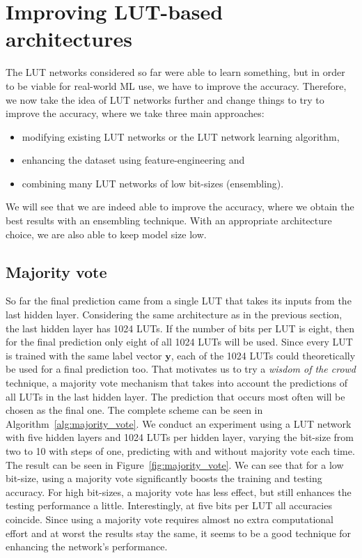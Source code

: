 \section{Improving LUT-based architectures}
The LUT networks considered so far were able to learn something, but in order to be viable for real-world ML use, we have to improve the accuracy. Therefore, we now take the idea of LUT networks further and change things to try to improve the accuracy, where we take three main approaches:

\begin{itemize}
  \item modifying existing LUT networks or the LUT network learning algorithm,
  \item enhancing the dataset using feature-engineering and
  \item combining many LUT networks of low bit-sizes (ensembling).
\end{itemize}We will see that we are indeed able to improve the accuracy, where we obtain the best results with an ensembling technique. With an appropriate architecture choice, we are also able to keep model size low.

\subsection{Majority vote} \label{sec:majority_vote}
So far the final prediction came from a single LUT that takes its inputs from the last hidden layer. Considering the same architecture as in the previous section, the last hidden layer has 1024 LUTs. If the number of bits per LUT is eight, then for the final prediction only eight of all 1024 LUTs will be used. Since every LUT is trained with the same label vector $\bm{y}$, each of the 1024 LUTs could theoretically be used for a final prediction too. That motivates us to try a \textit{wisdom of the crowd} technique, a majority vote mechanism that takes into account the predictions of all LUTs in the last hidden layer. The prediction that occurs most often will be chosen as the final one. The complete scheme can be seen in Algorithm~\ref{alg:majority_vote}. We conduct an experiment using a LUT network with five hidden layers and 1024 LUTs per hidden layer, varying the bit-size from two to 10 with steps of one, predicting with and without majority vote each time. The result can be seen in Figure~\ref{fig:majority_vote}. We can see that for a low bit-size, using a majority vote significantly boosts the training and testing accuracy. For high bit-sizes, a majority vote has less effect, but still enhances the testing performance a little. Interestingly, at five bits per LUT all accuracies coincide. Since using a majority vote requires almost no extra computational effort and at worst the results stay the same, it seems to be a good technique for enhancing the network's performance.

